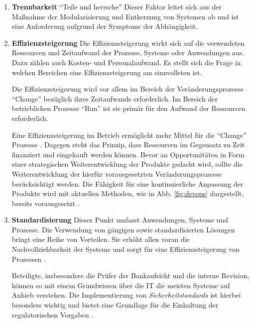 \begin{enumerate}
\item \textbf{Trennbarkeit}
    \enquote{Teile und herrsche} Dieser Faktor leitet sich aus der Maßnahme der Modularisierung und Entkernung von Systemen \citet{Bussmann2006} ab und ist eine Anforderung aufgrund der Symptome der Abhängigkeit.

\item \textbf{Effizienzsteigerung}
    Die Effizienzsteigerung wirkt sich auf die verwendeten Ressourcen und Zeitaufwand der Prozesse, Systeme oder Anwendungen aus. Dazu zählen auch Kosten- und Personalaufwand. Es stellt sich die Frage in welchen Bereichen eine Effizienzsteigerung am sinnvollsten ist.
    
    Die Effizienzsteigerung wird vor allem im Bereich der Veränderungsprozesse \enquote{Change} bezüglich ihres Zeitaufwands erforderlich. Im Bereich der betrieblichen Prozesse \enquote{Run} ist sie primär für den Aufwand der Ressourcen erforderlich.
    
    Eine Effizienzsteigerung im Betrieb ermöglicht mehr Mittel für die \enquote{Change} Prozesse \cite{Rausch2006}. Dagegen steht das Prinzip, dass Ressourcen im Gegensatz zu Zeit finanziert und eingekauft werden können. Bevor an Opportunitäten in Form einer strategischen Weiterentwicklung der Produkte \cite{Rausch2006} gedacht wird, sollte die Weiterentwicklung der hierfür vorausgesetzten Veränderungsprozesse berücksichtigt werden. Die Fähigkeit für eine kontinuierliche Anpassung \cite{Bussmann2006, Ganswindt2006} der Produkte wird mit aktuellen Methoden, wie in Abb. \ref{fig:devops} dargestellt, bereits vorausgesetzt \cite{Alt2017}.
    
    \item \textbf{Standardisierung}
    Dieser Punkt umfasst Anwendungen, Systeme und Prozesse. Die Verwendung von gängigen sowie standardisierten Lösungen bringt eine Reihe von Vorteilen. Sie erhöht allen voran die Nachvollziehbarkeit der Systeme und sorgt für eine Effizienzsteigerung von Prozessen \cite{Strietzel2018, Bussmann2006, Alt2017}. 
    
    Beteiligte, insbesondere die Prüfer der Bankaufsicht und die interne Revision, können so mit einem Grundwissen über die IT die meisten Systeme auf Anhieb verstehen. Die Implementierung von \emph{Sicherheitstandards \cite{IT-Grundschutz:2020, Disterer2013}} ist hierbei besonders wichtig und bietet eine Grundlage für die Einhaltung der regulatorischen Vorgaben \cite{MaRisk:2017, BAIT:2018}.
    

\end{enumerate}
